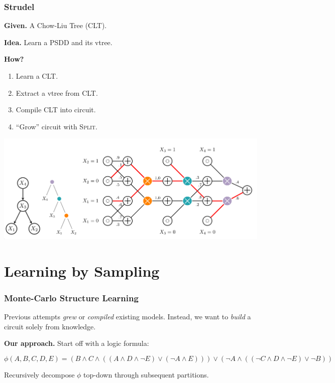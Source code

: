 \documentclass[usenames,dvipsnames]{beamer}
\begin{document}
\begin{frame}
  \frametitle{Strudel}

  \textbf{Given.} A Chow-Liu Tree (CLT).
  \vskip 0.5cm

  \textbf{Idea.} Learn a PSDD and its vtree.
  \vskip 0.5cm

  \textbf{How?}
  \begin{enumerate}
    \item Learn a CLT.
    \item Extract a vtree from CLT.
    \item Compile CLT into circuit.
    \item ``Grow'' circuit with \textrm{\textsc{Split}}.
  \end{enumerate}
  \vskip 0.5cm

  \hfill\cite{dang20}
\end{frame}

\begin{frame}
  \includegraphics[width=\textwidth]{imgs/strudel.png}
  \vskip 1.0cm
  \hfill\cite{dang20}
\end{frame}

\section{Learning by Sampling}

\begin{frame}
  \frametitle{Monte-Carlo Structure Learning}

  Previous attempts \emph{grew} or \emph{compiled} existing models.
  \vskip 0.5cm
  Instead, we want to \emph{build} a circuit solely from knowledge.
  \vskip 0.5cm

  \textbf{Our approach.} Start off with a logic formula:

  \begin{equation*}
    \scriptstyle
    \phi(A,B,C,D,E)=(B\wedge C\wedge((A\wedge D\wedge\neg E)\vee(\neg A\wedge E)))\vee(\neg A\wedge
    ((\neg C\wedge D\wedge\neg E)\vee\neg B))
  \end{equation*}
  \vskip 0.5cm

  Recursively decompose $\phi$ top-down through subsequent partitions.
\end{frame}
\end{document}
